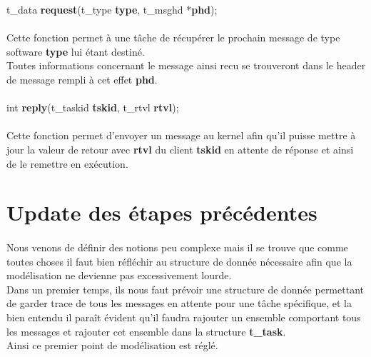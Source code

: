 \documentclass[10pt,a4wide]{article}
\begin{document}
\hspace{1.5cm}t\_data \textbf{request}(t\_type \textbf{type},
                                       t\_msghd *\textbf{phd});

\paragraph{}

Cette fonction permet \`a une t\^ache de r\'ecup\'erer le prochain message de type software \textbf{type} lui \'etant destin\'e.\\
Toutes informations concernant le message ainsi recu se trouveront dans le header de message rempli \`a cet effet \textbf{phd}.

\paragraph{}

\hspace{1.5cm}int \textbf{reply}(t\_taskid \textbf{tskid},
                                 t\_rtvl \textbf{rtvl});

\paragraph{}

Cette fonction permet d'envoyer un message au kernel afin qu'il puisse mettre \`a jour la valeur de retour avec \textbf{rtvl} du client
\textbf{tskid} en attente de r\'eponse et ainsi de le remettre en ex\'ecution.

\section{Update des \'etapes pr\'ec\'edentes}

\paragraph{}

Nous venons de d\'efinir des notions peu complexe mais il se trouve que comme toutes choses il faut bien r\'efl\'echir au structure de donn\'ee
n\'ecessaire afin que la mod\'elisation ne devienne pas excessivement lourde.\\
Dans un premier temps, ils nous faut pr\'evoir une structure de donn\'ee permettant de garder trace de tous les messages en attente pour une t\^ache
sp\'ecifique, et la bien entendu il para\^it \'evident qu'il faudra rajouter un ensemble comportant tous les messages et rajouter cet ensemble
dans la structure \textbf{t\_task}.\\
Ainsi ce premier point de mod\'elisation est r\'egl\'e.
\end{document}
